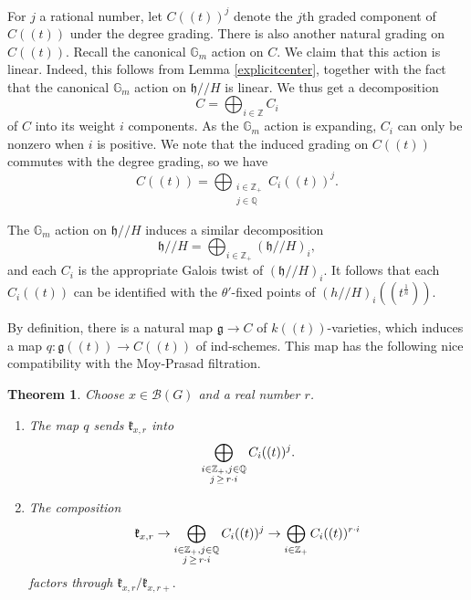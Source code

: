 \documentclass[12pt]{article}
\newtheorem{theorem}{Theorem}[section]
\theoremstyle{remark}
\begin{document}
For $j$ a rational number, let $C((t))^j$ denote the $j$th graded component of $C((t))$ under the degree grading. There is also another natural grading on $C((t))$. Recall the canonical $\mathbb{G}_m$ action on $C$. We claim that this action is linear. Indeed, this follows from Lemma \ref{explicitcenter}, together with the fact that the canonical $\mathbb{G}_m$ action on $\mathfrak{h}//H$ is linear. We thus get a decomposition
\[
C=\displaystyle\bigoplus_{i\in\mathbb{Z}}C_i
\]
of $C$ into its weight $i$ components. As the $\mathbb{G}_m$ action is expanding, $C_i$ can only be nonzero when $i$ is positive. We note that the induced grading on $C((t))$ commutes with the degree grading, so we have
\[
C((t))=\displaystyle\bigoplus_{\substack{i\in\mathbb{Z}_+\\j\in\mathbb{Q}}}C_i((t))^j.
\]

The $\mathbb{G}_m$ action on $\mathfrak{h}//H$ induces a similar decomposition
\[
\mathfrak{h}//H=\displaystyle\bigoplus_{i\in\mathbb{Z}_+}(\mathfrak{h}//H)_i,
\]
and each $C_i$ is the appropriate Galois twist of $(\mathfrak{h}//H)_i.$ It follows that each $C_i((t))$ can be identified with the $\theta'$-fixed points of $(h//H)_i((t^{\frac{1}{n}})).$

By definition, there is a natural map $\mathfrak{g}\rightarrow C$ of $k((t))$-varieties, which induces a map $q:\mathfrak{g}((t))\rightarrow C((t))$ of ind-schemes. This map has the following nice compatibility with the Moy-Prasad filtration.

\begin{theorem}\label{depthcenter}
Choose $x\in\mathcal{B}(G)$ and a real number $r$.
\begin{enumerate}
\item The map $q$ sends $\mathfrak{k}_{x,r}$ into
\[
\displaystyle\bigoplus_{\substack{i\in\mathbb{Z}_+,j\in\mathbb{Q}\\ j\thinspace\geq\thinspace r\cdot i}}C_i((t))^j.
\]
\item The composition
\[
\mathfrak{k}_{x,r}\rightarrow\displaystyle\bigoplus_{\substack{i\in\mathbb{Z}_+,j\in\mathbb{Q}\\ j\thinspace\geq\thinspace r\cdot i}}C_i((t))^j\rightarrow\displaystyle\bigoplus_{i\in\mathbb{Z}_+}C_i((t))^{r\cdot i}
\]
factors through $\mathfrak{k}_{x,r}/\mathfrak{k}_{x,r+}.$
\end{enumerate}
\end{theorem}
\end{document}
